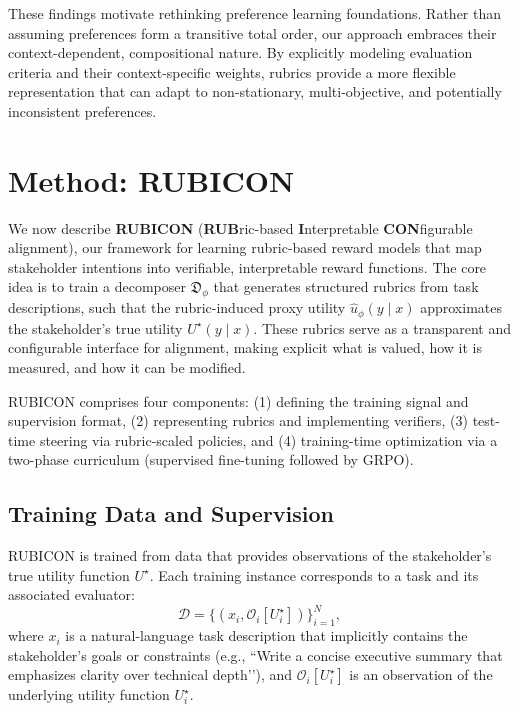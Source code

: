 \documentclass[sigconf]{acmart}
\begin{document}
These findings motivate rethinking preference learning foundations. Rather than assuming preferences form a transitive total order, our approach embraces their context-dependent, compositional nature. By explicitly modeling evaluation criteria and their context-specific weights, rubrics provide a more flexible representation that can adapt to non-stationary, multi-objective, and potentially inconsistent preferences.

\section{Method: RUBICON}
\label{sec:method}

We now describe \textbf{RUBICON} (\textbf{RUB}ric-based \textbf{I}nterpretable \textbf{CON}figurable alignment), our framework for learning rubric-based reward models that map stakeholder intentions into verifiable, interpretable reward functions. 
The core idea is to train a decomposer $\mathfrak{D}_\phi$ that generates structured rubrics from task descriptions, such that the rubric-induced proxy utility $\hat{u}_\phi(y \mid x)$ approximates the stakeholder’s true utility \(U^\star(y \mid x)\).
These rubrics serve as a transparent and configurable interface for alignment, making explicit what is valued, how it is measured, and how it can be modified.

RUBICON comprises four components:
(1) defining the training signal and supervision format,
(2) representing rubrics and implementing verifiers,
(3) test-time steering via rubric-scaled policies, and
(4) training-time optimization via a two-phase curriculum (supervised fine-tuning followed by GRPO).

\subsection{Training Data and Supervision}
\label{sec:training-data}

RUBICON is trained from data that provides observations of the stakeholder’s true utility function \(U^\star\).
Each training instance corresponds to a task and its associated evaluator:
\[
\mathcal{D} = \{(x_i, \mathcal{O}_i[U_i^\star])\}_{i=1}^N,
\]
where \(x_i\) is a natural-language task description that implicitly contains the stakeholder’s goals or constraints (e.g., “Write a concise executive summary that emphasizes clarity over technical depth’’), and \(\mathcal{O}_i[U_i^\star]\) is an observation of the underlying utility function \(U_i^\star\).
\end{document}
